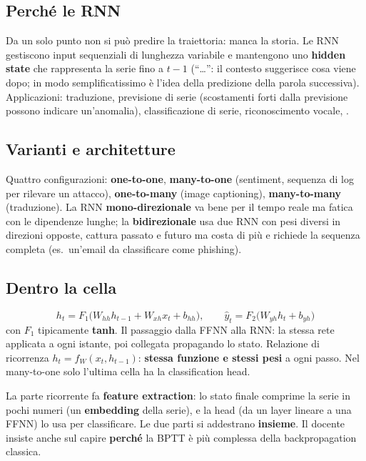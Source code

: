 \subsection{Perché le RNN}
Da un solo punto non si può predire la traiettoria: manca la storia. Le RNN gestiscono input
sequenziali di lunghezza variabile e mantengono uno \textbf{hidden state} che rappresenta la serie
fino a $t-1$ (``\ldots'': il contesto suggerisce cosa viene dopo; in modo
semplificatissimo è l'idea della predizione della parola successiva). Applicazioni: traduzione,
previsione di serie (scostamenti forti dalla previsione possono indicare un'anomalia), classificazione
di serie, riconoscimento vocale, .

\subsection{Varianti e architetture}
Quattro configurazioni: \textbf{one-to-one}, \textbf{many-to-one} (sentiment, sequenza di log per
rilevare un attacco), \textbf{one-to-many} (image captioning), \textbf{many-to-many} (traduzione).
La RNN \textbf{mono-direzionale} va bene per il tempo reale ma fatica con le dipendenze lunghe; la
\textbf{bidirezionale} usa due RNN con pesi diversi in direzioni opposte, cattura passato e futuro ma
costa di più e richiede la sequenza completa (es.\ un'email da classificare come phishing).

\subsection{Dentro la cella}
\[
h_t = F_1\big(W_{hh}h_{t-1} + W_{xh}x_t + b_{hh}\big), \qquad
\hat y_t = F_2\big(W_{yh}h_t + b_{yh}\big)
\]
con $F_1$ tipicamente \textbf{tanh}. Il passaggio dalla FFNN alla RNN: la stessa rete applicata a ogni
istante, poi collegata propagando lo stato. Relazione di ricorrenza $h_t = f_W(x_t, h_{t-1})$:
\textbf{stessa funzione e stessi pesi} a ogni passo. Nel many-to-one solo l'ultima cella ha la
classification head.

\begin{esame}
La parte ricorrente fa \textbf{feature extraction}: lo stato finale comprime la serie in pochi numeri
(un \textbf{embedding} della serie), e la head (da un layer lineare a una FFNN) lo usa per
classificare. Le due parti si addestrano \textbf{insieme}. Il docente insiste anche sul capire
\textbf{perché} la BPTT è più complessa della backpropagation classica.
\end{esame}

